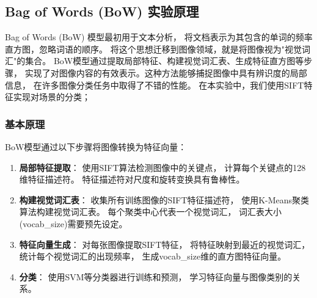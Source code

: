 \subsection{Bag of Words (BoW) 实验原理}

Bag of Words (BoW) 模型最初用于文本分析，
将文档表示为其包含的单词的频率直方图，忽略词语的顺序。
将这个思想迁移到图像领域，就是将图像视为"视觉词汇"的集合。
BoW模型通过提取局部特征、构建视觉词汇表、生成特征直方图等步骤，
实现了对图像内容的有效表示。这种方法能够捕捉图像中具有辨识度的局部信息，
在许多图像分类任务中取得了不错的性能。
在本实验中，我们使用SIFT特征实现对场景的分类；

\subsubsection{基本原理}
BoW模型通过以下步骤将图像转换为特征向量：

\begin{enumerate}
    \item \textbf{局部特征提取}：
    使用SIFT算法检测图像中的关键点，
    计算每个关键点的128维特征描述符。
    特征描述符对尺度和旋转变换具有鲁棒性。
    
    \item \textbf{构建视觉词汇表}：
    收集所有训练图像的SIFT特征描述符，
    使用K-Means聚类算法构建视觉词汇表。
    每个聚类中心代表一个视觉词汇，
    词汇表大小(vocab\_size)需要预先设定。
    
    \item \textbf{特征向量生成}：
    对每张图像提取SIFT特征，
    将特征映射到最近的视觉词汇，
    统计每个视觉词汇的出现频率，
    生成vocab\_size维的直方图特征向量。
    
    \item \textbf{分类}：
    使用SVM等分类器进行训练和预测，
    学习特征向量与图像类别的关系。
\end{enumerate}

